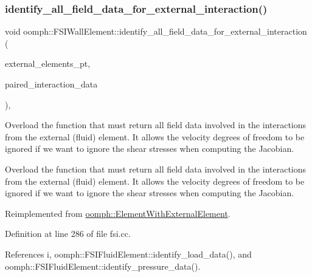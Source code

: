 \subsubsection{\texorpdfstring{identify\+\_\+all\+\_\+field\+\_\+data\+\_\+for\+\_\+external\+\_\+interaction()}{identify\_all\_field\_data\_for\_external\_interaction()}}
{\footnotesize\ttfamily void oomph\+::\+F\+S\+I\+Wall\+Element\+::identify\+\_\+all\+\_\+field\+\_\+data\+\_\+for\+\_\+external\+\_\+interaction (\begin{DoxyParamCaption}\item[{\hyperlink{classoomph_1_1Vector}{Vector}$<$ std\+::set$<$ \hyperlink{classoomph_1_1FiniteElement}{Finite\+Element} $\ast$$>$ $>$ const \&}]{external\+\_\+elements\+\_\+pt,  }\item[{std\+::set$<$ std\+::pair$<$ \hyperlink{classoomph_1_1Data}{Data} $\ast$, unsigned $>$ $>$ \&}]{paired\+\_\+interaction\+\_\+data }\end{DoxyParamCaption})\hspace{0.3cm}{\ttfamily [private]}, {\ttfamily [virtual]}}



Overload the function that must return all field data involved in the interactions from the external (fluid) element. It allows the velocity degrees of freedom to be ignored if we want to ignore the shear stresses when computing the Jacobian. 

Overload the function that must return all field data involved in the interactions from the external (fluid) element. It allows the velocity degrees of freedom to be ignored if we want to ignore the shear stresses when computing the Jacobian. 

Reimplemented from \hyperlink{classoomph_1_1ElementWithExternalElement_a822d64019a82588e16053ec86f37226c}{oomph\+::\+Element\+With\+External\+Element}.



Definition at line 286 of file fsi.\+cc.



References i, oomph\+::\+F\+S\+I\+Fluid\+Element\+::identify\+\_\+load\+\_\+data(), and oomph\+::\+F\+S\+I\+Fluid\+Element\+::identify\+\_\+pressure\+\_\+data().

\mbox{\label{classoomph_1_1FSIWallElement_ab8c98231f65ff11da582bf58ab1910fe}} 
